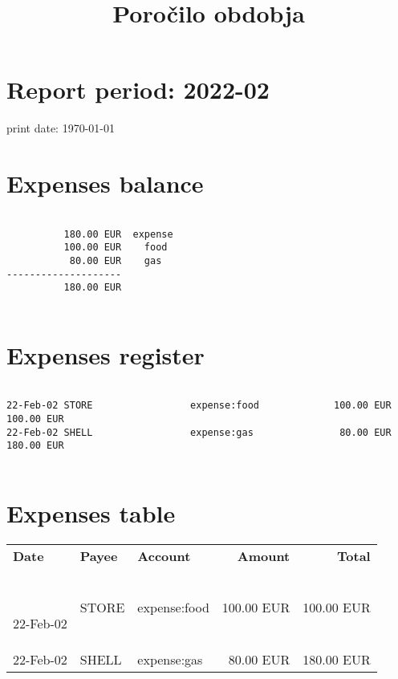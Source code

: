 \documentclass[a4paper, 10pt]{article}
\title{Poročilo obdobja}
\author{}
\date{}
\begin{document}
\section*{Report period: 2022-02 }

print date: \today



\section{Expenses balance}



\begin{verbatim}

          180.00 EUR  expense
          100.00 EUR    food
           80.00 EUR    gas
--------------------
          180.00 EUR
 

\end{verbatim}



\section{Expenses register}



\begin{verbatim}

22-Feb-02 STORE                 expense:food             100.00 EUR   100.00 EUR
22-Feb-02 SHELL                 expense:gas               80.00 EUR   180.00 EUR
 

\end{verbatim}



\section{Expenses table}



\begin{tabular}{lllrr}

\toprule

\textbf{Date} & \textbf{Payee} & \textbf{Account}& \textbf{Amount} & \textbf{Total}  \\\

\midrule

22-Feb-02 & STORE      & expense:food              &   100.00 EUR &   100.00 EUR  \\ 22-Feb-02 & SHELL      & expense:gas               &    80.00 EUR &   180.00 EUR  \\  

\bottomrule

\end{tabular}
\end{document}
